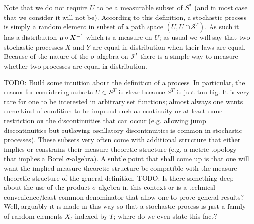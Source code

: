 Note that we do not require $U$ to be a measurable subset of $S^T$
(and in most case that we consider it will not be).
According to this definition, a stochastic process is simply a random
element in subset of a path space $(U, U \cap \mathcal{S}^T)$.  As such it has a
distribution $\mu \circ X^{-1}$ which is a measure on $U$; as usual we will say
that two stochastic processes $X$ and $Y$ are equal in distribution
when their laws are equal.  Because of the nature of the
$\sigma$-algebra on $\mathcal{S}^T$ there is a simple way to measure
whether two processes are equal in distribution.

TODO: Build some intuition about the definition of a process.  In
particular, the reason for considering subsets $U \subset S^T$ is
clear because $S^T$ is just too big.  It is very rare for one to be
interested in arbitrary set functions; almost always one wants some
kind of condition to be imposed such as continuity or at least some
restriction on the discontinuities that can occur (e.g. allowing jump
discontinuities but outlawing
oscillatory discontinuities is common in stochastic processes).  These
subsets very often come with additional structure that either implies or constrains their measure theoretic
structure (e.g. a metric topology that implies a Borel
$\sigma$-algebra).  A subtle point that shall come up is that one will
want the implied measure theoretic structure be compatible with the
measure theoretic structure of the general definition.
TODO: Is there something deep about the use of the product
$\sigma$-algebra in this context or is a technical convenience/least
common denominator that allow one to prove general results?  Well,
arguably it is made in this way so that a stochastic process is just a
family of random elements $X_t$ indexed by $T$; where do we even state
this fact?

